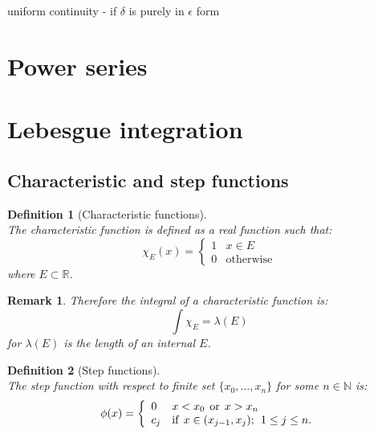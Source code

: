 \documentclass{article}
\newtheorem{definition}{Definition}[section]
\newtheorem*{remark}{Remark}
\begin{document}
uniform continuity - if $\delta$ is purely in $\epsilon$ form

\newpage
  
\section{Power series}

\newpage

\section{Lebesgue integration}

\subsection{Characteristic and step functions}
\begin{definition}[Characteristic functions]
    \hfill \\
    The characteristic function is defined as
    a real function such that:
    $$\chi_E(x) =
    \left\{
    \begin{array}{ll}
        1  & \mbox{} x \in E \\
        0 & \mbox{otherwise}
    \end{array}
    \right.$$
    where $E\subset\mathbb{R}$.
\end{definition}

\begin{remark}
    Therefore the integral of a characteristic function is:
    $$\int\chi_{E} = \lambda(E)$$
    for $\lambda(E)$ is the length of an internal $E$.
\end{remark}

\begin{definition}[Step functions]
    \hfill \\
    The step function with respect to
    finite set $\{x_0, \dots, x_n\}$
    for some $n \in \mathbb{N}$ is:
    $$\phi(x) =
    \left\{
    \begin{array}{ll}
	0  &  x < x_0 \hspace{0.06in} \text{or} \hspace{0.06in} x > x_n \\
	c_j & \mbox{if} \hspace{0.06in} x \in (x_{j-1}, x_j); \hspace{0.06in} 1 \leq j \leq n.
    \end{array}
    \right.$$
\end{definition}
\end{document}

